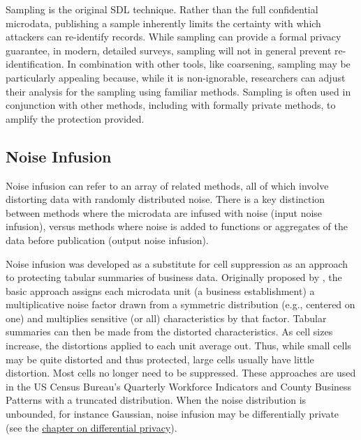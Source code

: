 Sampling is the original SDL technique. Rather than the full confidential microdata, publishing a sample inherently limits the certainty with which attackers can re-identify records. While sampling can provide a formal privacy guarantee, in modern, detailed surveys, sampling will not in general prevent re-identification. In combination with other tools, like coarsening, sampling may be particularly appealing because, while it is non-ignorable, researchers can adjust their analysis for the sampling using familiar methods. Sampling is often used in conjunction with other methods, including with formally private methods, to amplify the protection provided.

\hypertarget{noise-infusion}{%
\subsection{Noise Infusion}\label{noise-infusion}}

Noise infusion can refer to an array of related methods, all of which involve distorting data with randomly distributed noise. There is a key distinction between methods where the microdata are infused with noise (input noise infusion), versus methods where noise is added to functions or aggregates of the data before publication (output noise infusion).

Noise infusion was developed as a substitute for cell suppression as an approach to protecting tabular summaries of business data. Originally proposed by \citet{evans_using_1998}, the basic approach assigns each microdata unit (a business establishment) a multiplicative noise factor drawn from a symmetric distribution (e.g., centered on one) and multiplies sensitive (or all) characteristics by that factor. Tabular summaries can then be made from the distorted characteristics. As cell sizes increase, the distortions applied to each unit average out. Thus, while small cells may be quite distorted and thus protected, large cells usually have little distortion. Most cells no longer need to be suppressed. These approaches are used in the US Census Bureau's Quarterly Workforce Indicators \citep{abowd_lehd_2009,abowd_dynamically_2012} and County Business Patterns with a truncated distribution. When the noise distribution is unbounded, for instance Gaussian, noise infusion may be differentially private (see the \protect\hyperlink{diffpriv}{chapter on differential privacy}).

